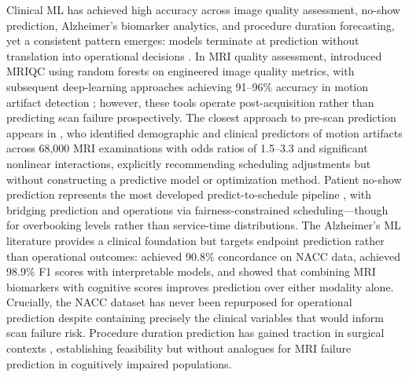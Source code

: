 \documentclass[11pt,a4paper]{article}
\begin{document}
Clinical ML has achieved high accuracy across image quality assessment, no-show prediction, Alzheimer's biomarker analytics, and procedure duration forecasting, yet a consistent pattern emerges: models terminate at prediction without translation into operational decisions \citep{kelly2019key, seneviratne2020bridging}. In MRI quality assessment, \citet{esteban2017mriqc} introduced MRIQC using random forests on engineered image quality metrics, with subsequent deep-learning approaches achieving 91--96\% accuracy in motion artifact detection \citep{vakli2023automatic, beljaards2024motion}; however, these tools operate post-acquisition rather than predicting scan failure prospectively. The closest approach to pre-scan prediction appears in \citet{porembka2025disparities}, who identified demographic and clinical predictors of motion artifacts across 68{,}000 MRI examinations with odds ratios of 1.5--3.3 and significant nonlinear interactions, explicitly recommending scheduling adjustments but without constructing a predictive model or optimization method. Patient no-show prediction represents the most developed predict-to-schedule pipeline \citep{dantas2018noshows, asan2022pediatric, silva2023decision}, with \citet{samorani2021overbooked} bridging prediction and operations via fairness-constrained scheduling---though for overbooking levels rather than service-time distributions. The Alzheimer's ML literature provides a clinical foundation but targets endpoint prediction rather than operational outcomes: \citet{song2023random} achieved 90.8\% concordance on NACC data, \citet{elsappagh2024explainable} achieved 98.9\% F1 scores with interpretable models, and \citet{coupe2019mri} showed that combining MRI biomarkers with cognitive scores improves prediction over either modality alone. Crucially, the NACC dataset has never been repurposed for operational prediction despite containing precisely the clinical variables that would inform scan failure risk. Procedure duration prediction has gained traction in surgical contexts \citep{bartek2019improving, master2023multicenter, spence2023scoping, martinez2021machine}, establishing feasibility but without analogues for MRI failure prediction in cognitively impaired populations.
\end{document}
